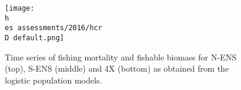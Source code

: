 \documentclass[11pt]{article}
\newcommand{\D}{.}
\newcommand{\h}{\string~}
\newcommand{\es}{bio.data/bio.snowcrab/}
\begin{document}
\begin{figure}
\centering
\texttt{[image: \\h \\es assessments/2016/hcr\\D default.png]}\\ 
\caption{Time series of fishing mortality and fishable biomass for N-ENS (top), S-ENS (middle) and 4X (bottom) as obtained from the logistic population models.}
\end{figure}
\clearpage
%
%
%
\end{document}
